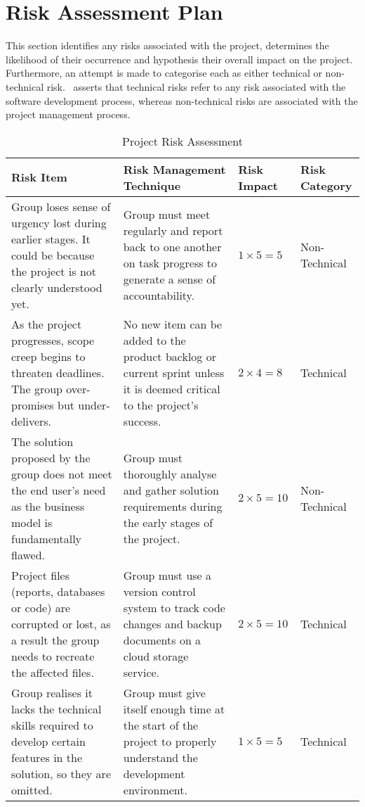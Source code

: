 \section{Risk Assessment Plan}

This section identifies any risks associated with the project, determines the likelihood of their occurrence and hypothesis their overall impact on the project. Furthermore, an attempt is made to categorise each as either technical or non-technical risk.~\parencite{dawson} asserts that technical risks refer to any risk associated with the software development process, whereas non-technical risks are associated with the project management process.

\begin{table}
  \caption[Project Risk Assessment]{Project Risk Assessment \hfill}
  \label{tab:runtime}
  \begin{tabular*}{14.0cm}{p{4.0cm}p{5.0cm}p{1.5cm}p{2cm}}
    \toprule
    Risk Item & Risk Management Technique & Risk Impact & Risk Category \\
    \midrule
    Group loses sense of urgency lost during earlier stages. It could be because the project is not clearly understood yet. & Group must meet regularly and report back to one another on task progress to generate a sense of accountability. & $1 \times 5 = 5$ & Non-Technical \\
    \addlinespace[0.5em]
    As the project progresses, scope creep begins to threaten deadlines. The group over-promises but under-delivers. & No new item can be added to the product backlog or current sprint unless it is deemed critical to the project’s success. & $2 \times 4 = 8$ & Technical \\
    \addlinespace[0.5em]
    The solution proposed by the group does not meet the end user’s need as the business model is fundamentally flawed. & Group must thoroughly analyse and gather solution requirements during the early stages of the project. & $2 \times 5 = 10$ & Non-Technical \\
    \addlinespace[0.5em]
    Project files (reports, databases or code) are corrupted or lost, as a result the group needs to recreate the affected files. & Group must use a version control system to track code changes and backup documents on a cloud storage service. & $2 \times 5 = 10$ & Technical \\
    \addlinespace[0.5em]
    Group realises it lacks the technical skills required to develop certain features in the solution, so they are omitted. & Group must give itself enough time at the start of the project to properly understand the development environment. & $1 \times 5 = 5$ & Technical \\

\end{tabular*}
\end{table}

